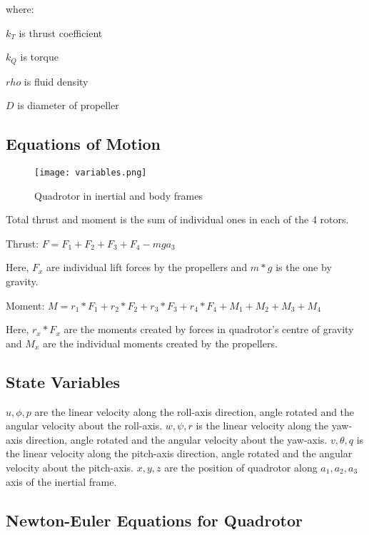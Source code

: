 \documentclass{article}
\begin{document}
\vspace{10pt}
where:

$k_T$ is thrust coefficient

$k_Q$ is torque 

$rho$ is fluid density

$D$ is diameter of propeller
\\

\subsection{Equations of Motion}

\begin{figure}[H]
    \centering
    \texttt{[image: variables.png]}
    \caption{Quadrotor in inertial and body frames}
    \label{fig:enter-label}
\end{figure}

Total thrust and moment is the sum of individual ones in each of the 4 rotors.
\vspace{10pt}

Thrust: $F = F_1 + F_2 + F_3 + F_4 - mga_3$

Here, $F_x$ are individual lift forces by the propellers and $m*g$ is the one by gravity.
\vspace{10pt}

Moment: $M = r_1 * F_1 + r_2 * F_2 + r_3 * F_3 + r_4 * F_4 + M_1 + M_2 + M_3 + M_4$

Here, $r_x*F_x$ are the moments created by forces in quadrotor's centre of gravity and $M_x$ are the individual moments created by the propellers.
\\

\subsection{State Variables}

$u, \phi, p$ are the linear velocity along the roll-axis direction, angle rotated and the angular velocity about the roll-axis.
$w, \psi, r$ is the linear velocity along the yaw-axis direction, angle rotated and the angular velocity about the yaw-axis.
$v, \theta, q$ is the linear velocity along the pitch-axis direction, angle rotated and the angular velocity about the pitch-axis.
$x, y, z$ are the position of quadrotor along $a_1, a_2, a_3$ axis of the inertial frame.
\\


\subsection{Newton-Euler Equations for Quadrotor}
\end{document}
